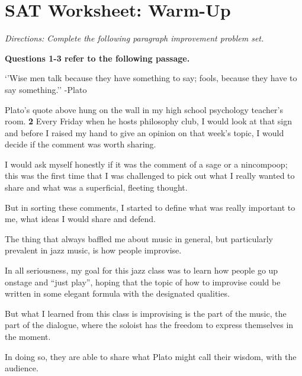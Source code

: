 \section{SAT Worksheet: Warm-Up}

\textit{Directions: Complete the following paragraph improvement problem set.}

\textbf{Questions 1-3 refer to the following passage.}

\begin{inparaenum}[\bfseries 1]
\item `'Wise men talk because they have something to say; fools, because they have to say something.''  -Plato

\item Plato's quote above hung on the wall in my high school psychology teacher's room. \textbf{2} Every Friday when he hosts philosophy club, I would look at that sign and before I raised my hand to give an opinion on that week's topic, I would decide if the comment was worth sharing. \item I would ask myself honestly if it was the comment of a sage or a nincompoop; this was the first time that I was challenged to pick out what I really wanted to share and what was a superficial, fleeting thought. \item But in sorting these comments, I started to define what was really important to me, what ideas I would share and defend.

\item The thing that always baffled me about music in general, but particularly prevalent in jazz music, is how people improvise. \item In all seriousness, my goal for this jazz class was to learn how people go up onstage and ``just play'', hoping that the topic of how to improvise could be written in some elegant formula with the designated qualities. \item But what I learned from this class is improvising is the part of the music, the part of the dialogue, where the soloist has the freedom to express themselves in the moment. \item In doing so, they are able to share what Plato might call their wisdom, with the audience.
\end{inparaenum}

